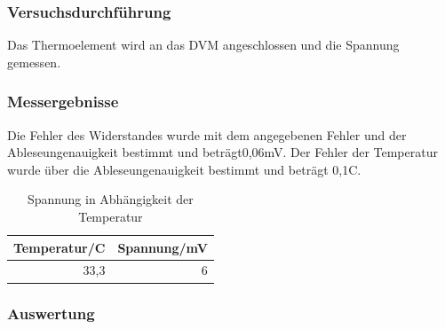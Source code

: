 \documentclass[12pt,a4paper]{article}
\begin{document}
\subsubsection*{Versuchsdurchführung}

Das Thermoelement wird an das DVM angeschlossen und die Spannung gemessen.

\subsubsection*{Messergebnisse}

Die Fehler des Widerstandes wurde mit dem angegebenen Fehler und der Ableseungenauigkeit bestimmt und beträgt0,06mV. Der Fehler der Temperatur wurde über die Ableseungenauigkeit bestimmt und beträgt 0,1C.


\begin{table}[H]
\begin{center}
\begin{tabular}{|r|r|}
\hline
\multicolumn{1}{|l|}{Temperatur/C} & \multicolumn{1}{l|}{Spannung/mV} \\ \hline
33,3 & 6 \\ \hline
\end{tabular}
\end{center}
\caption{Spannung in Abhängigkeit der Temperatur}
\label{tab:2_3}
\end{table}


\subsubsection*{Auswertung}
\end{document}
